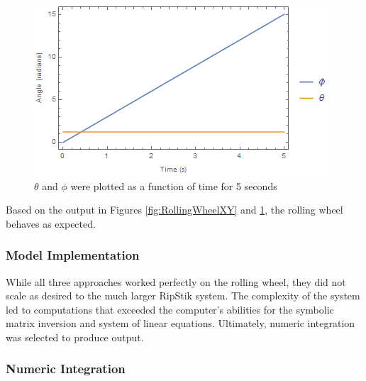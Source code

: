 \begin{figure}[!htb]
	\centering
	\includegraphics[width=\linewidth]{RollingWheelThetaPhi.png}
	\endminipage\hspace{1em}%
	\caption{$\theta$ and $\phi$ were plotted as a function of time for 5 seconds}\label{fig:RollingWheelThetaPhi}
\end{figure}

Based on the output in Figures \ref{fig:RollingWheelXY} and \ref{fig:RollingWheelThetaPhi}, the rolling wheel behaves as expected. 


\subsubsection{Model Implementation}

While all three approaches worked perfectly on the rolling wheel, they did not scale as desired to the much larger RipStik system.
The complexity of the system led to computations that exceeded the computer's abilities for the symbolic matrix inversion and system of linear equations.
Ultimately, numeric integration was selected to produce output.

\subsubsection{Numeric Integration}


